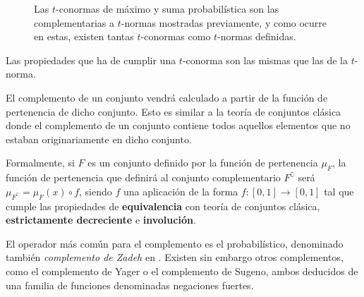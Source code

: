 \begin{figure}
	\centering
	\qquad
	\caption[$t$-conormas de máximo y suma probabilística]{Las $t$-conormas de máximo y suma probabilística son las complementarias a $t$-normas mostradas previamente, y como ocurre en estas, existen tantas $t$-conormas como $t$-normas definidas.}
	\label{fig:t-conorms}
\end{figure}

Las propiedades que ha de cumplir una $t$-conorma son las mismas que las de la $t$-norma.

El complemento de un conjunto vendrá calculado a partir de la función de pertenencia de dicho conjunto. Esto es similar a la teoría de conjuntos clásica donde el complemento de un conjunto contiene todos aquellos elementos que no estaban originariamente en dicho conjunto.

Formalmente, si $F$ es un conjunto definido por la función de pertenencia $\mu_F$, la función de pertenencia que definirá al conjunto complementario $F^\complement$ será $\mu_{F^\complement} = \mu_F(x) \circ f$, siendo $f$ una aplicación de la forma $f : [0,1] \rightarrow [0,1]$ tal que cumple las propiedades de \textbf{equivalencia} con teoría de conjuntos clásica, \textbf{estrictamente decreciente} e \textbf{involución}.

El operador más común para el complemento es el probabilístico, denominado también \textit{complemento de Zadeh} en . Existen sin embargo otros complementos, como el complemento de Yager o el complemento de Sugeno, ambos deducidos de una familia de funciones denominadas negaciones fuertes.

